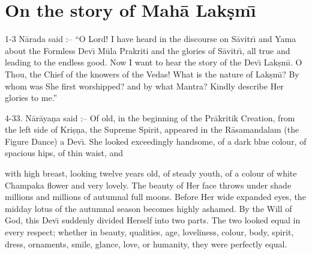 \chapter{On the story of Mah\=a Lak\d{s}m\={\i}}

1-3 N\=arada said :-- ``O Lord! I have heard in the discourse on S\=avitr\={\i} and Yama about the Formless Dev\={\i} M\=ula Prakriti and the glories of S\=avitr\={\i}, all true and leading to the endless good. Now I want to hear the story of the Dev\={\i} Lak\d{s}m\={\i}. O Thou, the Chief of the knowers of the Vedas! What is the nature of Lak\d{s}m\={\i}? By whom was She first worshipped? and by what Mantra? Kindly describe Her glories to me.''

4-33. N\=ar\=aya\d{n}a said :-- Of old, in the beginning of the Pr\=akritik Creation, from the left side of Kri\d{s}\d{n}a, the Supreme Spirit, appeared in the R\=asamandalam (the Figure Dance) a Dev\={\i}. She looked exceedingly handsome, of a dark blue colour, of spacious hips, of thin waist, and

with high breast, looking twelve years old, of steady youth, of a colour of white Champaka flower and very lovely. The beauty of Her face throws under shade millions and millions of autumnal full moons. Before Her wide expanded eyes, the midday lotus of the autumnal season becomes highly ashamed. By the Will of God, this Dev\={\i} suddenly divided Herself into two parts. The two looked equal in every respect; whether in beauty, qualities, age, loveliness, colour, body, spirit, dress, ornaments, smile, glance, love, or humanity, they were perfectly equal.


